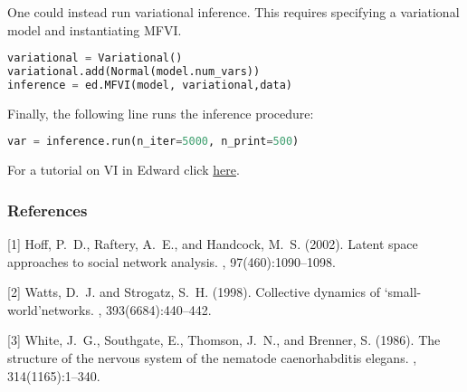 One could instead run variational inference. This requires specifying a variational model and instantiating MFVI.
\begin{lstlisting}[language=Python]
variational = Variational()
variational.add(Normal(model.num_vars))
inference = ed.MFVI(model, variational,data)
\end{lstlisting}
Finally, the following line runs the inference procedure:
\begin{lstlisting}[language=Python]
var = inference.run(n_iter=5000, n_print=500)
\end{lstlisting}
For a tutorial on VI in Edward click \href{tut_MAP.html}{here}.

\subsubsection{References}
\begin{thebibliography}{}
[1] Hoff, P.~D., Raftery, A.~E., and Handcock, M.~S. (2002).
\newblock Latent space approaches to social network analysis.
,
  97(460):1090--1098.

[2] Watts, D.~J. and Strogatz, S.~H. (1998).
\newblock Collective dynamics of ‘small-world’networks.
, 393(6684):440--442.

[3] White, J.~G., Southgate, E., Thomson, J.~N., and Brenner, S. (1986).
\newblock The structure of the nervous system of the nematode caenorhabditis
  elegans.
, 314(1165):1--340.
\end{thebibliography}

